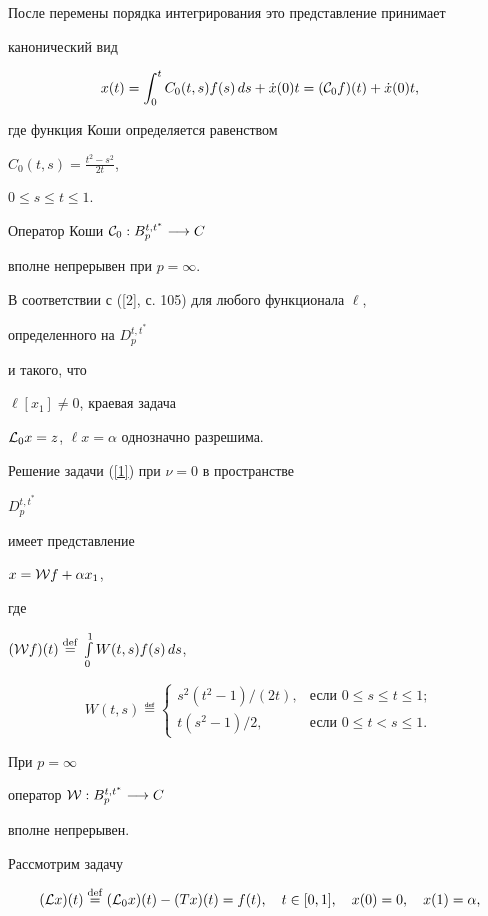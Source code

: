 После перемены порядка интегрирования это представление принимает


канонический вид


$$


x(t)=\int_0^t {C}_0(t,s)f(s)\,ds + \Dot x(0) t=


({\cal C}_0 f)(t) + \Dot x(0) t,


$$


где функция Коши определяется равенством


${C}_0(t,s)= \frac{t^2 - s^2}{2t}$,


$0\le s\le t\le 1$.


Оператор Коши ${\cal C}_0:{ B}_p^{t,t^*}\longrightarrow { C}$


вполне непрерывен при $p=\infty$.


В соответствии с ([2], с. 105) для любого функционала $\ell$,


определенного на ${ D}_p^{t,t^*}$


и такого, что


$\ell [x_1]\ne 0$, краевая задача


${{\cal L}}_0x =z$, $\ell x = \alpha$ однозначно разрешима.


Решение задачи (\ref{1}) при $\nu = 0$ в пространстве


${ D}^{t,t^*}_p$


имеет представление


$x={\cal W}f + \alpha x_1$,


где


$({\cal W}f)(t)\overset{\mathrm{def}}{=}{}\int\limits_0^1 W(t,s)f(s)\,ds$,


$$


{W}(t,s)\eqdef


\begin{cases}


s^2(t^2-1)/(2t),& \text{если } 0\le s\le t \le 1;\\


t(s^2-1)/2,& \text{если } 0\le t < s \le 1.


\end{cases}


$$


При $ p=\infty$


оператор ${\cal W}: B_p^{t,t^*}\longrightarrow { {C}}$


вполне непрерывен.





Рассмотрим задачу


\begin{equation}


({\cal L} x)(t)\eqdef ({\cal L}_0 x)(t) - (Tx)(t)=f(t),\quad


t\in [0,1], \quad


x(0)=0,\quad x(1) = \alpha,


\label{2}


\end{equation}


